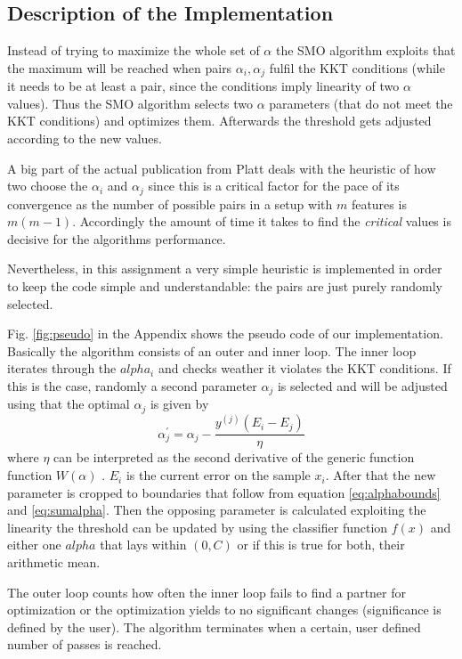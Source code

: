 \subsection{Description of the Implementation}
Instead of trying to maximize the whole set of $\alpha$ the SMO algorithm exploits that the maximum will be reached when pairs $\alpha _i, \alpha _j$ fulfil the KKT conditions (while it needs to be at least a pair, since the conditions imply linearity of two $\alpha$ values). Thus the SMO algorithm selects two $\alpha$ parameters (that do not meet the KKT conditions) and optimizes them. Afterwards the threshold gets adjusted according to the new values.

A big part of the actual publication from Platt deals with the heuristic of how two choose the $\alpha _i$ and $\alpha _j$ since this is a critical factor for the pace of its convergence as the number of possible pairs in a setup with $m$ features is $m(m-1)$. Accordingly the amount of time it takes to find the \textit{critical} values is decisive for the algorithms performance.

Nevertheless, in this assignment a very simple heuristic is implemented in order to keep the code simple and understandable: the pairs are just purely randomly selected.

Fig. \ref{fig:pseudo} in the Appendix shows the pseudo code of our implementation. Basically the algorithm consists of an outer and inner loop. The inner loop iterates through the $alpha _i$ and checks weather it violates the KKT conditions. If this is the case, randomly a second parameter $\alpha _j$ is selected and will be adjusted using that the optimal $\alpha _j$ is given by
\begin{equation}
\alpha^{'}_j = \alpha _j  - \frac{y^{(j)} (E_i - E_j)}{\eta}
\end{equation}
where $\eta$ can be interpreted as the second derivative of the generic function function $W(\alpha)$ \cite{smo}. $E_i$ is the current error on the sample $x_i$. After that the new parameter is cropped to boundaries that follow from equation \ref{eq:alphabounds} and \ref{eq:sumalpha}. Then the opposing parameter is calculated exploiting the linearity the threshold can be updated by using the classifier function $f(x)$ and either one $alpha$ that lays within $(0, C)$ or if this is true for both, their arithmetic mean.

The outer loop counts how often the inner loop fails to find a partner for optimization or the optimization yields to no significant changes (significance is defined by the user). The algorithm terminates when a certain, user defined number of passes is reached.

